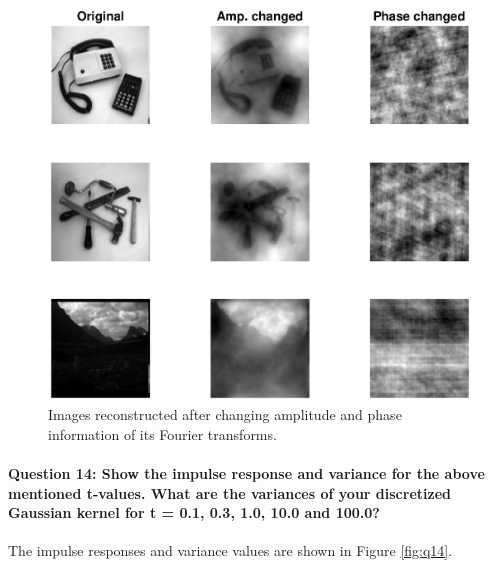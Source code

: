 \documentclass[12pt]{article}
\begin{document}
\begin{figure}[htbp]
 \centering
 \includegraphics[width=\textwidth]{q13}
 \caption{Images reconstructed after changing amplitude and phase information of its Fourier transforms.}
 \label{fig:q13}
\end{figure}

\paragraph{Question 14: Show the impulse response and variance for the above mentioned t-values. What are the variances of your discretized Gaussian kernel for t = 0.1, 0.3, 1.0, 10.0 and
100.0?}
The impulse responses and variance values are shown in Figure \ref{fig:q14}.
\end{document}
